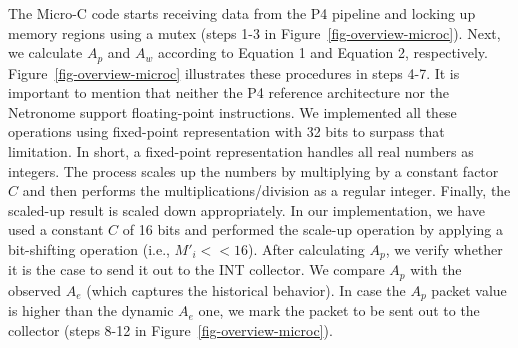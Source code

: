 %
The Micro-C code starts receiving data from the P4 pipeline and locking up memory regions using a mutex (steps 1-3 in Figure~\ref{fig-overview-microc}).
%
Next, we calculate $A_p$  and $A_w$ according to Equation 1 and Equation 2, respectively. Figure~\ref{fig-overview-microc} illustrates these procedures in steps 4-7.  It is important to mention that neither the P4 reference architecture nor the Netronome support floating-point instructions. We implemented all these operations using fixed-point representation with 32 bits to surpass that limitation. In short, a fixed-point representation handles all real numbers as integers. The process scales up the numbers by multiplying by a constant factor $C$ and then performs the multiplications/division as a regular integer. Finally, the scaled-up result is scaled down appropriately. In our implementation, we have used a constant $C$ of 16 bits and performed the scale-up operation by applying a bit-shifting operation (i.e., $M'_i << 16$). After calculating $A_p$, we verify whether it is the case to send it out to the INT collector. We compare $A_p$ with the observed $A_e$ (which captures the historical behavior). In case the  $A_p$ packet value is higher than the dynamic $A_e$ one, we mark the packet to be sent out to the collector (steps 8-12 in Figure~\ref{fig-overview-microc}).



